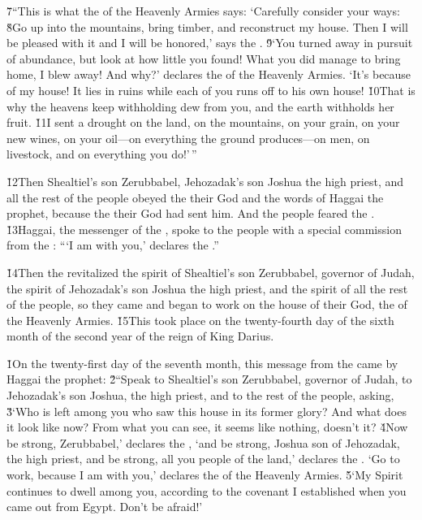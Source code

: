 \v{7}``This is what the  of the Heavenly Armies says: `Carefully consider your ways: \v{8}Go up into the mountains, bring timber, and reconstruct my house. Then I will be pleased with it and I will be honored,' says the . \v{9}`You turned away in pursuit of abundance, but look at how little you found! What you did manage to bring home, I blew away! And why?' declares the  of the Heavenly Armies. `It's because of my house! It lies in ruins while each of you runs off to his own house! \v{10}That is why the heavens keep withholding dew from you, and the earth withholds her fruit. \v{11}I sent a drought on the land, on the mountains, on your grain, on your new wines, on your oil---on everything the ground produces---on men, on livestock, and on everything you do!'\,''

\v{12}Then Shealtiel's son Zerubbabel, Jehozadak's son Joshua the high priest, and all the rest of the people obeyed the  their God and the words of Haggai the prophet, because the  their God had sent him. And the people feared the . \v{13}Haggai, the messenger of the , spoke to the people with a special commission from the : ```I am with you,' declares the .''

\v{14}Then the  revitalized the spirit of Shealtiel's son Zerubbabel, governor of Judah, the spirit of Jehozadak's son Joshua the high priest, and the spirit of all the rest of the people, so they came and began to work on the house of their God, the  of the Heavenly Armies. \v{15}This took place on the twenty-fourth day of the sixth month of the second year of the reign of King Darius.

\v{1}On the twenty-first day of the seventh month, this message from the  came by Haggai the prophet: \v{2}``Speak to Shealtiel's son Zerubbabel, governor of Judah, to Jehozadak's son Joshua, the high priest, and to the rest of the people, asking, \v{3}`Who is left among you who saw this house in its former glory? And what does it look like now? From what you can see, it seems like nothing, doesn't it? \v{4}Now be strong, Zerubbabel,' declares the , `and be strong, Joshua son of Jehozadak, the high priest, and be strong, all you people of the land,' declares the . `Go to work, because I am with you,' declares the  of the Heavenly Armies. \v{5}`My Spirit continues to dwell among you, according to the covenant I established when you came out from Egypt. Don't be afraid!'

